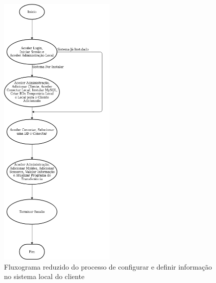\documentclass[11pt,twoside,a4paper]{report}
\begin{document}
\begin{figure}
	\begin{center}
		\hspace{3.5cm}
		\includegraphics[width=0.5\textwidth]{fluxograma_simples_administracao01} %
		\caption[Fluxograma reduzido do processo de configurar e definir informação no sistema local do cliente]{Fluxograma reduzido do processo de configurar e definir informação no sistema local do cliente}
		\label{fig:aplicacao_simples_admin}
	\end{center}
\end{figure}

\newpage
\end{document}
